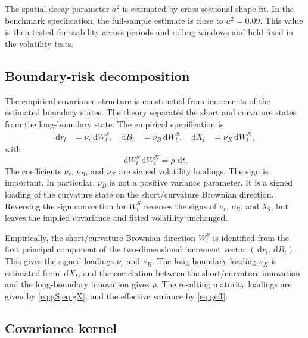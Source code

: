 \documentclass[11pt]{article}
\newcommand{\dd}{\,\mathrm{d}}
\begin{document}
The spatial decay parameter $a^2$ is estimated by cross-sectional shape fit. In the benchmark specification, the full-sample estimate is close to $a^2=0.09$. This value is then tested for stability across periods and rolling windows and held fixed in the volatility tests.

\subsection{Boundary-risk decomposition}

The empirical covariance structure is constructed from increments of the estimated boundary states. The theory separates the short and curvature states from the long-boundary state. The empirical specification is
\begin{align}
  \dd r_t &= \nu_r\dd W_t^S, &
  \dd B_t &= \nu_B\dd W_t^S, &
  \dd X_t &= \nu_X\dd W_t^X,
  \label{eq:state-risk}
\end{align}
with
\begin{equation}
  \dd W_t^S\dd W_t^X=\rho\,\dd t.
\end{equation}
The coefficients $\nu_r$, $\nu_B$, and $\nu_X$ are signed volatility loadings. The sign is important. In particular, $\nu_B$ is not a positive variance parameter. It is a signed loading of the curvature state on the short/curvature Brownian direction. Reversing the sign convention for $W_t^S$ reverses the signs of $\nu_r$, $\nu_B$, and $\lambda_S$, but leaves the implied covariance and fitted volatility unchanged.

Empirically, the short/curvature Brownian direction $W_t^S$ is identified from the first principal component of the two-dimensional increment vector $(\dd r_t,\dd B_t)$. This gives the signed loadings $\nu_r$ and $\nu_B$. The long-boundary loading $\nu_X$ is estimated from $\dd X_t$, and the correlation between the short/curvature innovation and the long-boundary innovation gives $\rho$. The resulting maturity loadings are given by \cref{eq:gS,eq:gX}, and the effective variance by \cref{eq:geff}.

\subsection{Covariance kernel}
\end{document}
